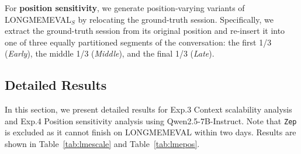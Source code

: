 For \textbf{position sensitivity}, we generate position-varying variants of LONGMEMEVAL$_S$ by relocating the ground-truth session. Specifically, we extract the ground-truth session from its original position and re-insert it into one of three equally partitioned segments of the conversation: the first 1/3 (\emph{Early}), the middle 1/3 (\emph{Middle}), and the final 1/3 (\emph{Late}).




\subsection{Detailed Results}
\label{sec:app:exp:result}
In this section, we present detailed results for Exp.3 Context scalability analysis and Exp.4 Position sensitivity analysis using Qwen2.5-7B-Instruct. Note that \texttt{Zep} is excluded as it cannot finish on LONGMEMEVAL within two days. Results are shown in Table~\ref{tab:lmescale} and Table~\ref{tab:lmepos}.




